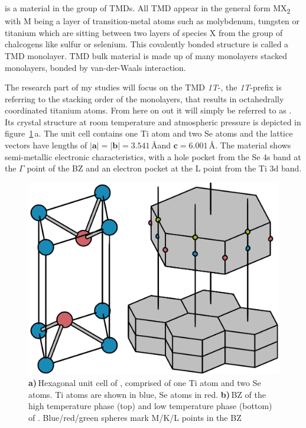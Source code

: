 \ts\space is a material in the group of \acp{TMD}.
All \ac{TMD} appear in the general form MX\textsubscript{2} with M being a layer of transition-metal atoms such as molybdenum, tungsten or titanium which are sitting between two layers of species X from the group of chalcogens like sulfur or selenium.
This covalently bonded structure is called a \ac{TMD} monolayer.
\Ac{TMD} bulk material is made up of many monolayers stacked monolayers, bonded by van-der-Waals interaction.

The research part of my studies will focus on the \ac{TMD} \textit{1T}-\ts, the \textit{1T}-prefix is referring to the stacking order of the monolayers, that results in octahedrally coordinated titanium atoms.
From here on out it will simply be referred to as \ts.
Its crystal structure at room temperature and atmospheric pressure is depicted in figure~\ref{fig:crystal}\,a.
The unit cell contains one Ti atom and two Se atoms and the lattice vectors have lengths of $|\mathbf{a}|=|\mathbf{b}|=3.541$\,\AA\space and $\mathbf{c}=6.001$\,\AA\cite{patel1983}.
The material shows semi-metallic electronic characteristics\cite{bachrach1976}, with a hole pocket from the Se 4s band at the $\Gamma$ point of the \ac{BZ} and an electron pocket at the L point from the Ti 3d band\cite{zunger1978}.

\begin{figure}[!t]
	\begin{minipage}{0.5\columnwidth}
		\includegraphics[width=\columnwidth]{figs/tise2_crystal.png}
	\end{minipage}
	\hspace{0.04\columnwidth}
	\begin{minipage}{0.45\columnwidth}
		\caption{\textbf{a)}\,Hexagonal unit cell of \ts, comprised of one Ti atom and two Se atoms. Ti atoms are shown in blue, Se atoms in red. \textbf{b)}\,\ac{BZ} of the high temperature phase (top) and low temperature phase (bottom) of \ts. Blue/red/green spheres mark M/K/L points in the \ac{BZ}}
		\label{fig:crystal}
	\end{minipage}
\end{figure}

